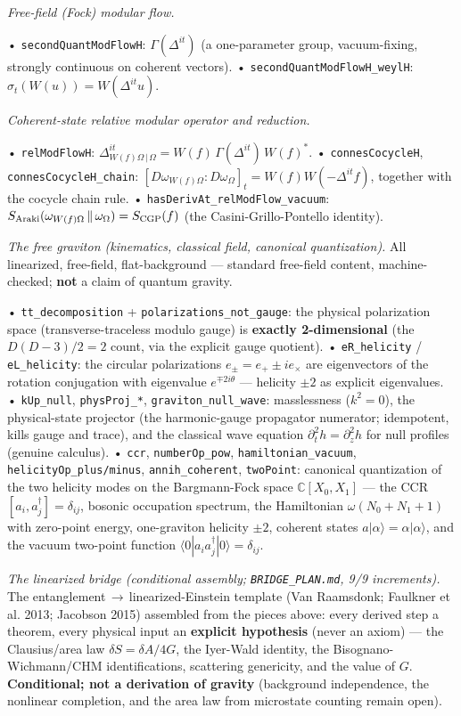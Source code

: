 \documentclass[11pt,a4paper]{article}
\begin{document}
\emph{Free-field (Fock) modular flow.}

  • \texttt{secondQuantModFlowH}: $\Gamma(\Delta^{it})$ (a one-parameter group, vacuum-fixing, strongly continuous on coherent vectors).
  • \texttt{secondQuantModFlowH\_weylH}: $\sigma_t(W(u))=W(\Delta^{it}u)$.

\emph{Coherent-state relative modular operator and reduction.}

  • \texttt{relModFlowH}: $\Delta^{it}_{W(f)\Omega\,|\,\Omega}=W(f)\,\Gamma(\Delta^{it})\,W(f)^*$.
  • \texttt{connesCocycleH}, \texttt{connesCocycleH\_chain}: $[D\omega_{W(f)\Omega}:D\omega_\Omega]_t=W(f)W(-\Delta^{it}f)$, together with the cocycle chain rule.
  • \texttt{hasDerivAt\_relModFlow\_vacuum}: $S_{\rm Araki}(\omega_{W(f)\Omega}\,\|\,\omega_\Omega)=S_{\rm CGP}(f)$ (the Casini-Grillo-Pontello identity).

\emph{The free graviton (kinematics, classical field, canonical quantization).} All linearized, free-field, flat-background — standard free-field content, machine-checked; \textbf{not} a claim of quantum gravity.

  • \texttt{tt\_decomposition} + \texttt{polarizations\_not\_gauge}: the physical polarization space (transverse-traceless modulo gauge) is \textbf{exactly 2-dimensional} (the $D(D{-}3)/2=2$ count, via the explicit gauge quotient).
  • \texttt{eR\_helicity} / \texttt{eL\_helicity}: the circular polarizations $e_\pm=e_+\!\pm i e_\times$ are eigenvectors of the rotation conjugation with eigenvalue $e^{\mp 2i\theta}$ — helicity $\pm 2$ as explicit eigenvalues.
  • \texttt{kUp\_null}, \texttt{physProj\_*}, \texttt{graviton\_null\_wave}: masslessness ($k^2=0$), the physical-state projector (the harmonic-gauge propagator numerator; idempotent, kills gauge and trace), and the classical wave equation $\partial_t^2 h=\partial_z^2 h$ for null profiles (genuine calculus).
  • \texttt{ccr}, \texttt{numberOp\_pow}, \texttt{hamiltonian\_vacuum}, \texttt{helicityOp\_plus/minus}, \texttt{annih\_coherent}, \texttt{twoPoint}: canonical quantization of the two helicity modes on the Bargmann-Fock space $\mathbb{C}[X_0,X_1]$ — the CCR $[a_i,a_j^\dagger]=\delta_{ij}$, bosonic occupation spectrum, the Hamiltonian $\omega(N_0{+}N_1{+}1)$ with zero-point energy, one-graviton helicity $\pm 2$, coherent states $a|\alpha\rangle=\alpha|\alpha\rangle$, and the vacuum two-point function $\langle 0|a_ia_j^\dagger|0\rangle=\delta_{ij}$.

\emph{The linearized bridge (conditional assembly; \texttt{BRIDGE\_PLAN.md}, 9/9 increments).} The entanglement$\,\to\,$linearized-Einstein template (Van Raamsdonk; Faulkner et al. 2013; Jacobson 2015) assembled from the pieces above: every derived step a theorem, every physical input an \textbf{explicit hypothesis} (never an axiom) — the Clausius/area law $\delta S=\delta A/4G$, the Iyer-Wald identity, the Bisognano-Wichmann/CHM identifications, scattering genericity, and the value of $G$. \textbf{Conditional; not a derivation of gravity} (background independence, the nonlinear completion, and the area law from microstate counting remain open).
\end{document}
